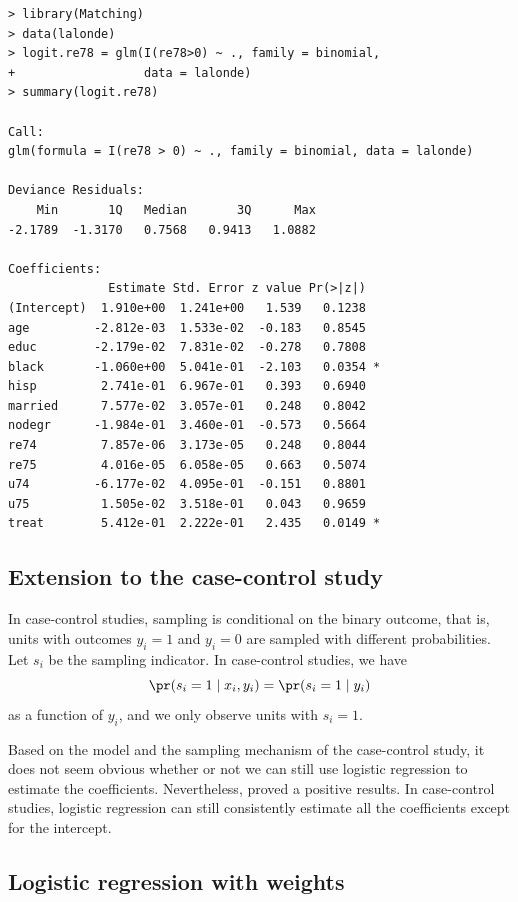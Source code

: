\begin{lstlisting}
> library(Matching)
> data(lalonde)
> logit.re78 = glm(I(re78>0) ~ ., family = binomial, 
+                  data = lalonde)
> summary(logit.re78)

Call:
glm(formula = I(re78 > 0) ~ ., family = binomial, data = lalonde)

Deviance Residuals: 
    Min       1Q   Median       3Q      Max  
-2.1789  -1.3170   0.7568   0.9413   1.0882  

Coefficients:
              Estimate Std. Error z value Pr(>|z|)  
(Intercept)  1.910e+00  1.241e+00   1.539   0.1238  
age         -2.812e-03  1.533e-02  -0.183   0.8545  
educ        -2.179e-02  7.831e-02  -0.278   0.7808  
black       -1.060e+00  5.041e-01  -2.103   0.0354 *
hisp         2.741e-01  6.967e-01   0.393   0.6940  
married      7.577e-02  3.057e-01   0.248   0.8042  
nodegr      -1.984e-01  3.460e-01  -0.573   0.5664  
re74         7.857e-06  3.173e-05   0.248   0.8044  
re75         4.016e-05  6.058e-05   0.663   0.5074  
u74         -6.177e-02  4.095e-01  -0.151   0.8801  
u75          1.505e-02  3.518e-01   0.043   0.9659  
treat        5.412e-01  2.222e-01   2.435   0.0149 *
\end{lstlisting}

 

\subsection{Extension to the case-control study}\label{sec::case-control}

In case-control studies, sampling is conditional on the binary outcome, that is, units with outcomes $y_i=1$ and $y_i=0$ are sampled with different probabilities. Let $s_i$ be the sampling indicator. In case-control studies, we have
$$
\pr(s_i =1\mid x_i, y_i) = \pr(s_i =1\mid  y_i) 
$$
as a function of $y_i$, and we only observe units with $s_i = 1$. 


Based on the model and the sampling mechanism of the case-control study, it does not seem obvious whether or not we can still use logistic regression to estimate the coefficients. Nevertheless, \citet{prentice1979logistic} proved a positive results. In case-control studies, logistic regression can still consistently estimate all the coefficients except for the intercept.




\subsection{Logistic regression with weights}

